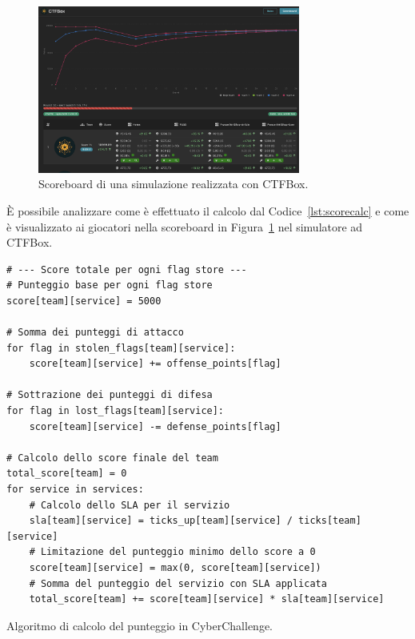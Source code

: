\begin{figure}[H]
    \centering
    \includegraphics[width=0.77\textwidth]{images/chapter1/ctfbox_scoreboard.png}
    \caption{Scoreboard di una simulazione realizzata con CTFBox.}\label{fig:ctfbox_scoreboard}
\end{figure}

È possibile analizzare come è effettuato il calcolo dal Codice~\ref{lst:scorecalc} e come è visualizzato ai giocatori nella scoreboard in Figura~\ref{fig:ctfbox_scoreboard} nel simulatore \gls{ad} CTFBox.

\begin{listing}[H]
\begin{verbatim}
# --- Score totale per ogni flag store ---
# Punteggio base per ogni flag store
score[team][service] = 5000

# Somma dei punteggi di attacco
for flag in stolen_flags[team][service]:
    score[team][service] += offense_points[flag]

# Sottrazione dei punteggi di difesa
for flag in lost_flags[team][service]:
    score[team][service] -= defense_points[flag]

# Calcolo dello score finale del team
total_score[team] = 0
for service in services:
    # Calcolo dello SLA per il servizio
    sla[team][service] = ticks_up[team][service] / ticks[team][service]
    # Limitazione del punteggio minimo dello score a 0
    score[team][service] = max(0, score[team][service])
    # Somma del punteggio del servizio con SLA applicata
    total_score[team] += score[team][service] * sla[team][service]
\end{verbatim}
\vspace{-1em}
\caption{Algoritmo di calcolo del punteggio in CyberChallenge.}\label{lst:scorecalc}
\end{listing}

